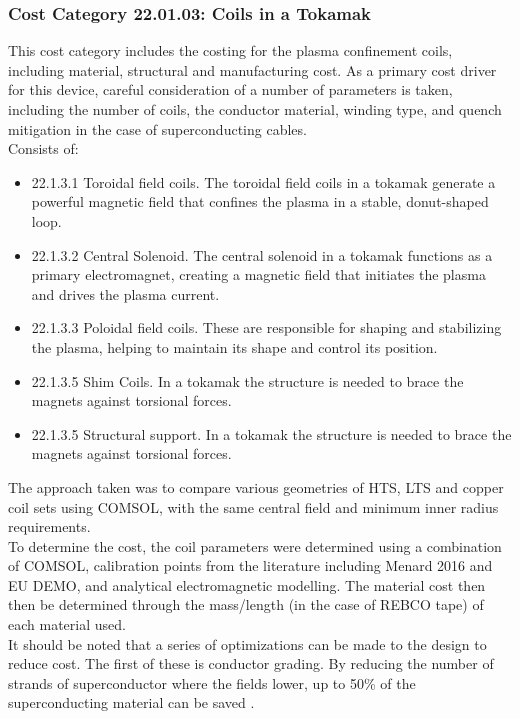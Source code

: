 \subsubsection*{Cost Category 22.01.03: Coils in a Tokamak}

This cost category includes the costing for the plasma confinement coils, including  material, structural and manufacturing cost. As a primary cost driver for this device, careful consideration of a number of parameters is taken, including the number of coils, the conductor material, winding type, and quench mitigation in the case of superconducting cables.\\

Consists of:

\begin{itemize}
    \item 22.1.3.1 Toroidal field coils. The toroidal field coils in a tokamak generate a powerful magnetic field that confines the plasma in a stable, donut-shaped loop.
    \item 22.1.3.2 Central Solenoid. The central solenoid in a tokamak functions as a primary electromagnet, creating a magnetic field that initiates the plasma and drives the plasma current.
    \item 22.1.3.3 Poloidal field coils. These are responsible for shaping and stabilizing the plasma, helping to maintain its shape and control its position.
    \item 22.1.3.5 Shim Coils. In a tokamak the structure is needed to brace the magnets against torsional forces.    
    \item 22.1.3.5 Structural support. In a tokamak the structure is needed to brace the magnets against torsional forces.
\end{itemize}
   

The approach taken was to compare various geometries of HTS, LTS and copper coil sets using COMSOL, with the same central field and minimum inner radius requirements.\\

To determine the cost, the coil parameters were determined using a combination of COMSOL, calibration points from the literature including Menard 2016 \cite{Menard2016} and EU DEMO, and analytical electromagnetic modelling. The material cost then then be determined through the mass/length (in the case of REBCO tape) of each material used.\\

It should be noted that a series of optimizations can be made to the design to reduce cost. The first of these is conductor grading. By reducing the number of strands of superconductor where the fields lower, up to 50\% of the superconducting material can be saved \cite{uglietti2018progressing}.\\

